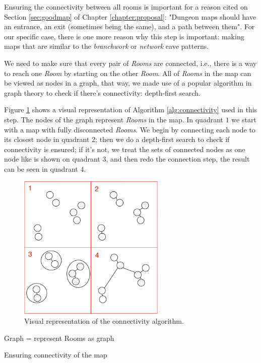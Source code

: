 Ensuring the connectivity between all rooms is important for a reason cited on Section \ref{sec:goodmap} of Chapter \ref{chapter:proposal}: "Dungeon maps should have an entrance, an exit (sometimes being the same), and a path between them". For our specific case, there is one more reason why this step is important: making maps that are similar to the \emph{branchwork} or \emph{network} cave patterns.

We need to make sure that every pair of \emph{Rooms} are connected, i.e., there is a way to reach one \emph{Room} by starting on the other \emph{Room}. All of \emph{Rooms} in the map can be viewed as nodes in a graph, that way, we made use of a popular algorithm in graph theory to check if there's connectivity: depth-first search.

Figure \ref{fig:connectivity} shows a visual representation of Algorithm  \ref{alg:connectivity} used in this step. The nodes of the graph represent \emph{Rooms} in the map. In quadrant \(1\) we start with a map with fully disconnected \emph{Rooms}. We begin by connecting each node to its closest node in quadrant \(2\); then we do a depth-first search to check if connectivity is ensured; if it's not, we treat the sets of connected nodes as one node like is shown on quadrant \(3\), and then redo the connection step, the result can be seen in quadrant \(4\).

\begin{figure}[h]
    \caption{Visual representation of the connectivity algorithm.}
    \centerline{\includegraphics[width=7cm]{images/development/graph_connect.png}}
    \label{fig:connectivity}
\end{figure}

\begin{algorithm}[h]
 \DontPrintSemicolon
 Graph = represent Rooms as graph\;
 \caption{Ensuring connectivity of the map}
\label{alg:connectivity}
\end{algorithm} 

